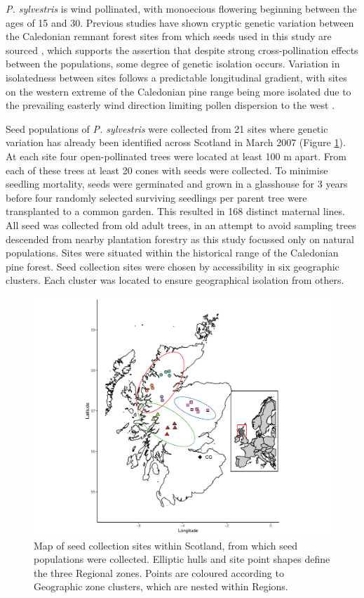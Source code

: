 \documentclass[a4paper, 11pt]{article}
\begin{document}
\textit{P. sylvestris} is wind pollinated, with monoecious flowering beginning between the ages of 15 and 30. Previous studies have shown cryptic genetic variation between the Caledonian remnant forest sites from which seeds used in this study are sourced \citep{Donnelly2018}, which supports the assertion that despite strong cross-pollination effects between the populations, some degree of genetic isolation occurs. Variation in isolatedness between sites follows a predictable longitudinal gradient, with sites on the western extreme of the Caledonian pine range being more isolated due to the prevailing easterly wind direction limiting pollen dispersion to the west \citep{Gonzalez2018}. 

Seed populations of \textit{P. sylvestris} were collected from 21 sites where genetic variation has already been identified across Scotland in March 2007 (Figure \ref{site_map}). At each site four open-pollinated trees were located at least 100 m apart. From each of these trees at least 20 cones with seeds were collected. To minimise seedling mortality, seeds were germinated and grown in a glasshouse for 3 years before four randomly selected surviving seedlings per parent tree were transplanted to a common garden. This resulted in 168 distinct maternal lines. All seed was collected from old adult trees, in an attempt to avoid sampling trees descended from nearby plantation forestry as this study focussed only on natural populations. Sites were situated within the historical range of the Caledonian pine forest. Seed collection sites were chosen by accessibility in six geographic clusters. Each cluster was located to ensure geographical isolation from others. 

\begin{figure}
	\includegraphics[width=\textwidth]{site_map}
	\caption{Map of seed collection sites within Scotland, from which seed populations were collected. Elliptic hulls and site point shapes define the three Regional zones. Points are coloured according to Geographic zone clusters, which are nested within Regions.} 
	\label{site_map}
\end{figure}
\end{document}
